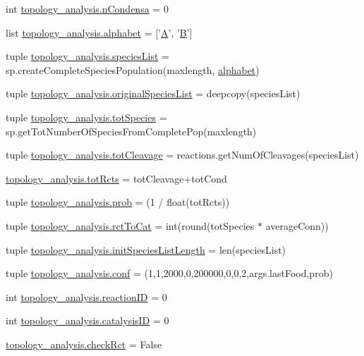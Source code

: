 \begin{DoxyCompactItemize}
\item 
int \hyperlink{a00159_a38aa665f11207bbd8cd2da4c382d4aca}{topology\+\_\+analysis.\+n\+Condensa} = 0
\item 
list \hyperlink{a00159_ab0d9c13eee214bf78b20760bf2835248}{topology\+\_\+analysis.\+alphabet} = \mbox{[}'\hyperlink{a00111_ab4f8a2431d9ad6efec44b47971737c52}{A}', '\hyperlink{a00111_afb39b9efa52a33745c5e622fa358a97f}{B}'\mbox{]}
\item 
tuple \hyperlink{a00159_a5bfc4cfa78ac777159cb0ca9c9c5c2f6}{topology\+\_\+analysis.\+species\+List} = sp.\+create\+Complete\+Species\+Population(maxlength, \hyperlink{a00113_abcbc32fc68e4323620d6171a17310212}{alphabet})
\item 
tuple \hyperlink{a00159_a62b034cfe14eff36f09dd65a51ae7c9c}{topology\+\_\+analysis.\+original\+Species\+List} = deepcopy(species\+List)
\item 
tuple \hyperlink{a00159_ac657414359bc072005d43b2328119a7d}{topology\+\_\+analysis.\+tot\+Species} = sp.\+get\+Tot\+Number\+Of\+Species\+From\+Complete\+Pop(maxlength)
\item 
tuple \hyperlink{a00159_a1e875e49e1f980d461a398fd6a072b0b}{topology\+\_\+analysis.\+tot\+Cleavage} = reactions.\+get\+Num\+Of\+Cleavages(species\+List)
\item 
\hyperlink{a00159_a059c41eb160321f87ba469fddd20eda7}{topology\+\_\+analysis.\+tot\+Rcts} = tot\+Cleavage+tot\+Cond
\item 
tuple \hyperlink{a00159_aad2c05e3d2146196ed236911dd796f6e}{topology\+\_\+analysis.\+prob} = (1 / float(tot\+Rcts))
\item 
tuple \hyperlink{a00159_afa804d4b1d39a63de9f14e5ab379ae34}{topology\+\_\+analysis.\+rct\+To\+Cat} = int(round(tot\+Species $\ast$ average\+Conn))
\item 
tuple \hyperlink{a00159_af2370a811b14632a793a28e451be8150}{topology\+\_\+analysis.\+init\+Species\+List\+Length} = len(species\+List)
\item 
tuple \hyperlink{a00159_aa468c4ff92202c7d89fb631e8cb54dc8}{topology\+\_\+analysis.\+conf} = (1,1,2000,0,200000,0,0,2,args.\+last\+Food,prob)
\item 
int \hyperlink{a00159_a07d632b487fabd051ab725ee95a85368}{topology\+\_\+analysis.\+reaction\+I\+D} = 0
\item 
int \hyperlink{a00159_a35953bf84aa0f7a2a3ffa3f68190c0fa}{topology\+\_\+analysis.\+catalysis\+I\+D} = 0
\item 
\hyperlink{a00159_a6f49caf3b9250cab918ae8dc5aef9931}{topology\+\_\+analysis.\+check\+Rct} = False

\end{DoxyCompactItemize}
